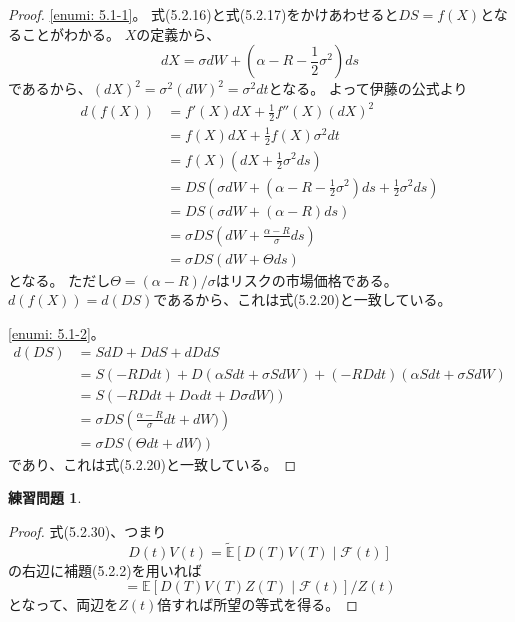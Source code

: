 \documentclass[uplatex]{jsarticle}
\theoremstyle{definition}
\newtheorem{prob}[prob]{練習問題}
\def\E{\mathbb{E}}
\def\mcF{\mathcal{F}}
\begin{document}
\begin{proof}
  \ref{enumi: 5.1-1}。
  式(5.2.16)と式(5.2.17)をかけあわせると\(DS = f(X)\)となることがわかる。
  \(X\)の定義から、
  \[
  dX = \sigma dW + \left(\alpha - R - \frac{1}{2}\sigma^2\right) ds
  \]
  であるから、\((dX)^2 = \sigma^2 (dW)^2 = \sigma^2 dt\)となる。
  よって伊藤の公式より
  \begin{align*}
    d(f(X)) &= f'(X)dX + \frac{1}{2}f''(X)(dX)^2 \\
    &= f(X)dX + \frac{1}{2}f(X) \sigma^2 dt \\
    &= f(X) \left( dX + \frac{1}{2} \sigma^2 ds\right) \\
    &= DS \left( \sigma dW +
    \left(\alpha - R - \frac{1}{2}\sigma^2\right) ds
    + \frac{1}{2} \sigma^2 ds\right) \\
    &= DS \left( \sigma dW + \left(\alpha - R\right) ds \right) \\
    &= \sigma DS \left( dW + \frac{\alpha - R}{\sigma} ds \right) \\
    &= \sigma DS \left( dW + \Theta ds \right)
  \end{align*}
  となる。
  ただし\(\Theta = (\alpha - R)/\sigma\)はリスクの市場価格である。
  \(d(f(X))=d(DS)\)であるから、これは式(5.2.20)と一致している。

  \ref{enumi: 5.1-2}。
  \begin{align*}
    d(DS) &= SdD + DdS + dDdS \\
    &= S(-RDdt) + D(\alpha S dt + \sigma SdW)
    + (-RD dt)(\alpha S dt + \sigma SdW) \\
    &= S\left( -RDdt + D\alpha dt + D\sigma dW)\right) \\
    &= \sigma DS\left( \frac{\alpha - R}{\sigma} dt + dW)\right) \\
    &= \sigma DS\left( \Theta dt + dW)\right)
  \end{align*}
  であり、これは式(5.2.20)と一致している。
\end{proof}






\begin{prob}\label{prob: 5.2}

\end{prob}

\begin{proof}
  式(5.2.30)、つまり
  \[D(t)V(t) = \tilde{\E}[D(T)V(T) \mid \mcF(t)]\]
  の右辺に補題(5.2.2)を用いれば
  \[=\E[D(T)V(T)Z(T)\mid \mcF(t)]/Z(t)\]
  となって、両辺を\(Z(t)\)倍すれば所望の等式を得る。
\end{proof}
\end{document}
